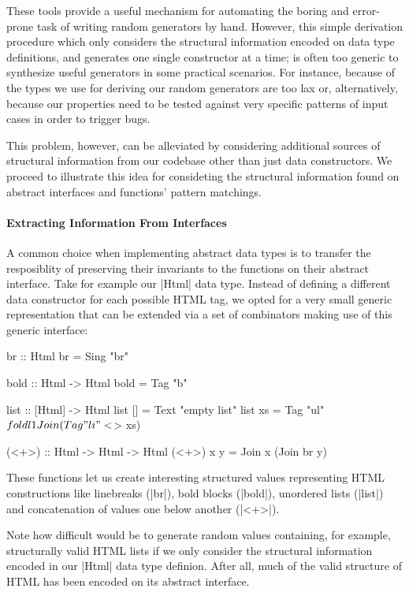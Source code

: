 %
These tools provide a useful mechanism for automating the boring and error-prone
task of writing random generators by hand.
%
However, this simple derivation procedure which only considers the structural
information encoded on data type definitions, and generates one single
constructor at a time; is often too generic to synthesize useful generators in
some practical scenarios.
%
For instance, because of the types we use for deriving our random generators are
too lax or, alternatively, because our properties need to be tested against very
specific patterns of input cases in order to trigger bugs.


This problem, however, can be alleviated by considering additional sources of
structural information from our codebase other than just data constructors.
%
We proceed to illustrate this idea for consideting the structural information
found on abstract interfaces and functions' pattern matchings.


%
\paragraph{Extracting Information From Interfaces}

A common choice when implementing abstract data types is to transfer the
resposiblity of preserving their invariants to the functions on their abstract
interface.
%
Take for example our |Html| data type.
%
Instead of defining a different data constructor for each possible HTML tag, we
opted for a very small generic representation that can be extended via a set of
combinators making use of this generic interface:

\begin{code}
br :: Html
br = Sing "br"

bold :: Html -> Html
bold = Tag "b"

list :: [Html] -> Html
list []  = Text "empty list"
list xs  = Tag "ul" $ foldl1 Join (Tag "li" <$> xs)

(<+>) :: Html -> Html -> Html
(<+>) x y = Join x (Join br y)
\end{code} %

These functions let us create interesting structured values representing HTML
constructions like linebreaks (|br|), bold blocks (|bold|), unordered lists
(|list|) and concatenation of values one below another (|<+>|).

Note how difficult would be to generate random values containing, for example,
structurally valid HTML lists if we only consider the structural information
encoded in our |Html| data type definion.
%
After all, much of the valid structure of HTML has been encoded on its abstract
interface.

